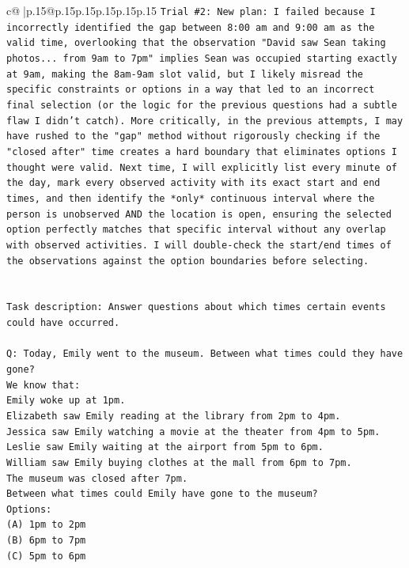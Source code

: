 \documentclass{article}
\begin{document}
{\begin{supertabular}{c@{$\;$}|p{.15\linewidth}@{}p{.15\linewidth}p{.15\linewidth}p{.15\linewidth}p{.15\linewidth}p{.15\linewidth}}
{{{\texttt{Trial \#2: New plan: I failed because I incorrectly identified the gap between 8:00 am and 9:00 am as the valid time, overlooking that the observation "David saw Sean taking photos... from 9am to 7pm" implies Sean was occupied starting exactly at 9am, making the 8am{-}9am slot valid, but I likely misread the specific constraints or options in a way that led to an incorrect final selection (or the logic for the previous questions had a subtle flaw I didn't catch). More critically, in the previous attempts, I may have rushed to the "gap" method without rigorously checking if the "closed after" time creates a hard boundary that eliminates options I thought were valid. Next time, I will explicitly list every minute of the day, mark every observed activity with its exact start and end times, and then identify the *only* continuous interval where the person is unobserved AND the location is open, ensuring the selected option perfectly matches that specific interval without any overlap with observed activities. I will double{-}check the start/end times of the observations against the option boundaries before selecting.} \\
\\ 
\\ 
\texttt{Task description: Answer questions about which times certain events could have occurred.} \\
\\ 
\texttt{Q: Today, Emily went to the museum. Between what times could they have gone?} \\
\texttt{We know that:} \\
\texttt{Emily woke up at 1pm.} \\
\texttt{Elizabeth saw Emily reading at the library from 2pm to 4pm.} \\
\texttt{Jessica saw Emily watching a movie at the theater from 4pm to 5pm.} \\
\texttt{Leslie saw Emily waiting at the airport from 5pm to 6pm.} \\
\texttt{William saw Emily buying clothes at the mall from 6pm to 7pm.} \\
\texttt{The museum was closed after 7pm.} \\
\texttt{Between what times could Emily have gone to the museum?} \\
\texttt{Options:} \\
\texttt{(A) 1pm to 2pm} \\
\texttt{(B) 6pm to 7pm} \\
\texttt{(C) 5pm to 6pm} \\
}}}
\end{supertabular}}
\end{document}
